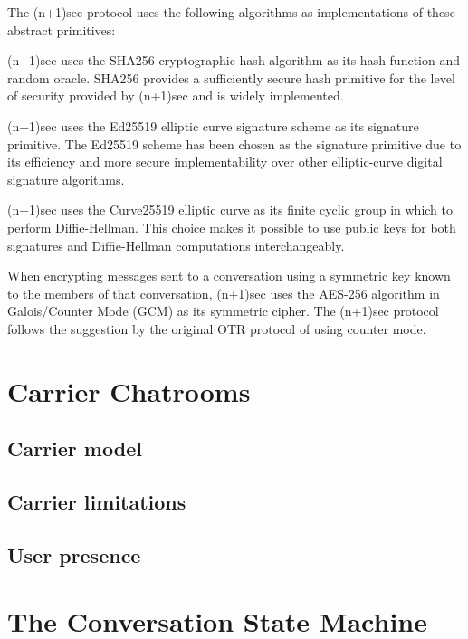 \documentclass{article}
\begin{document}
The (n+1)sec protocol uses the following algorithms as implementations of these abstract primitives:
\begin{description}[noitemsep]
\item[Cryptographic hash.] (n+1)sec uses the SHA256 cryptographic hash algorithm as its hash function and random oracle. SHA256 provides a sufficiently secure hash primitive for the level of security provided by (n+1)sec and is widely implemented.
\item[Signature scheme.] (n+1)sec uses the Ed25519 elliptic curve signature scheme as its signature primitive. The Ed25519 scheme has been chosen as the signature primitive due to its efficiency and more secure implementability over other elliptic-curve digital signature algorithms.
\item[Cyclic group.] (n+1)sec uses the Curve25519 elliptic curve as its finite cyclic group in which to perform Diffie-Hellman. This choice makes it possible to use public keys for both signatures and Diffie-Hellman computations interchangeably.
\item[Symmetric cipher.] When encrypting messages sent to a conversation using a symmetric key known to the members of that conversation, (n+1)sec uses the AES-256 algorithm in Galois/Counter Mode (GCM) as its symmetric cipher. The (n+1)sec protocol follows the suggestion by the original OTR protocol \cite{otr} of using counter mode.
\end{description}



\section{Carrier Chatrooms}
\label{sec:carrier-chatrooms}

\subsection{Carrier model}


\subsection{Carrier limitations}


\subsection{User presence}



\section{The Conversation State Machine}
\label{sec:conversation-state-machine}
\end{document}
